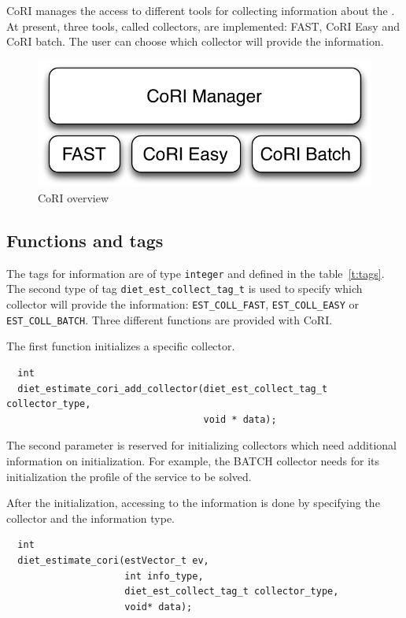 CoRI manages the access to different tools for collecting information about the
\sed. At present, three tools, called collectors, are implemented: FAST, CoRI
Easy and CoRI batch. The user can choose which collector will provide the
information.

\begin{figure}[h]
  \begin{center}
    \includegraphics[scale=0.5]{fig/overviewCori}
    \caption{CoRI overview}
    \label{fig:cori-overview}
  \end{center}
\end{figure}

\subsection{Functions and tags}
The tags for information are of type \texttt{integer} and defined in the
table~\ref{t:tags}. The second type of tag \texttt{diet\_est\_collect\_tag\_t}
is used to specify which collector will provide the information:
\texttt{EST\_COLL\_FAST}, \texttt{EST\_COLL\_EASY} or
\texttt{EST\_COLL\_BATCH}. Three different functions are provided with CoRI.

The first function initializes a specific collector.

\footnotesize
\begin{verbatim}
  int
  diet_estimate_cori_add_collector(diet_est_collect_tag_t collector_type,
                                   void * data);
\end{verbatim}
\normalsize The second parameter is reserved for initializing collectors which
need additional information on initialization. For example, the BATCH collector
needs for its initialization the profile of the service to be solved.

After the initialization, accessing to the information is done by specifying
the collector and the information type.
\footnotesize
\begin{verbatim}
  int
  diet_estimate_cori(estVector_t ev,
                     int info_type,
                     diet_est_collect_tag_t collector_type,
                     void* data);
\end{verbatim}
\normalsize

